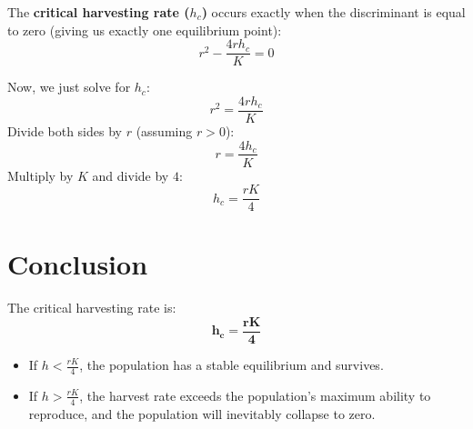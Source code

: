 \documentclass[12pt]{article}
\begin{document}
The \textbf{critical harvesting rate ($h_c$)} occurs exactly when the discriminant is equal to zero (giving us exactly one equilibrium point):
\begin{equation*}
r^2 - \frac{4rh_c}{K} = 0
\end{equation*}

Now, we just solve for $h_c$:
\begin{equation*}
r^2 = \frac{4rh_c}{K}
\end{equation*}
Divide both sides by $r$ (assuming $r > 0$):
\begin{equation*}
r = \frac{4h_c}{K}
\end{equation*}
Multiply by $K$ and divide by $4$:
\begin{equation*}
h_c = \frac{rK}{4}
\end{equation*}

\section{Conclusion}
The critical harvesting rate is:
\begin{equation*}
\mathbf{h_c = \frac{rK}{4}}
\end{equation*}
\begin{itemize}
    \item If $h < \frac{rK}{4}$, the population has a stable equilibrium and survives.
    \item If $h > \frac{rK}{4}$, the harvest rate exceeds the population's maximum ability to reproduce, and the population will inevitably collapse to zero.
\end{itemize}
\end{document}
